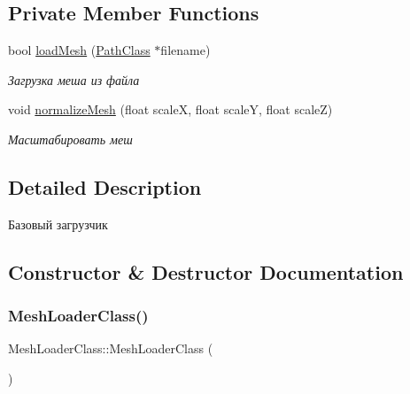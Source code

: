 \subsection*{Private Member Functions}
\begin{DoxyCompactItemize}
\item 
bool \hyperlink{class_mesh_loader_class_ab5f774e53ad0716336571cb2b5c6433b}{load\+Mesh} (\hyperlink{class_path_class}{Path\+Class} $\ast$filename)
\begin{DoxyCompactList}\small\item\em Загрузка меша из файла \end{DoxyCompactList}\item 
void \hyperlink{class_mesh_loader_class_ae242b7c70bceaea17fc42dfab9e1c9b6}{normalize\+Mesh} (float scaleX, float scaleY, float scaleZ)
\begin{DoxyCompactList}\small\item\em Масштабировать меш \end{DoxyCompactList}\end{DoxyCompactItemize}


\subsection{Detailed Description}
Базовый загрузчик 

\subsection{Constructor \& Destructor Documentation}
\mbox{\label{class_mesh_loader_class_af1abc44c331a467a87a1b358944b1ecf}} 
\subsubsection{\texorpdfstring{Mesh\+Loader\+Class()}{MeshLoaderClass()}\hspace{0.1cm}{\footnotesize\ttfamily [1/2]}}
{\footnotesize\ttfamily Mesh\+Loader\+Class\+::\+Mesh\+Loader\+Class (\begin{DoxyParamCaption}{ }\end{DoxyParamCaption})}

\mbox{\label{class_mesh_loader_class_afbade68e7fdc2ba6a661dfc995e23f6c}} 
